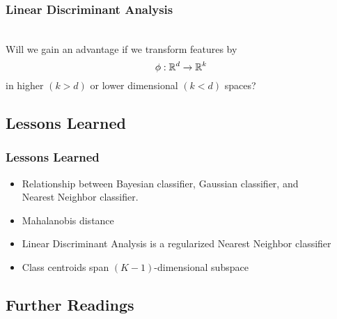 \begin{frame}
  \frametitle{Linear Discriminant Analysis \cont}

   \\[.5cm]

  Will we gain an advantage if we transform features by $$\phi: \mathbb{R}^d\rightarrow \mathbb{R}^k$$ in higher $(k>d)$ or lower dimensional $(k<d)$ spaces?
\end{frame}


\subsection{Lessons Learned}

\begin{frame}
  \frametitle{Lessons Learned}
 
 \begin{itemize}
    \item Relationship between Bayesian classifier, Gaussian classifier, and \\
      Nearest Neighbor classifier. \\[.5cm]
    \item Mahalanobis distance \\[.5cm]
    \item Linear Discriminant Analysis is a regularized Nearest Neighbor classifier \\[.5cm]
    \item Class centroids span $(K-1)$-dimensional subspace 
  \end{itemize}
\end{frame}



\subsection{Further Readings}

